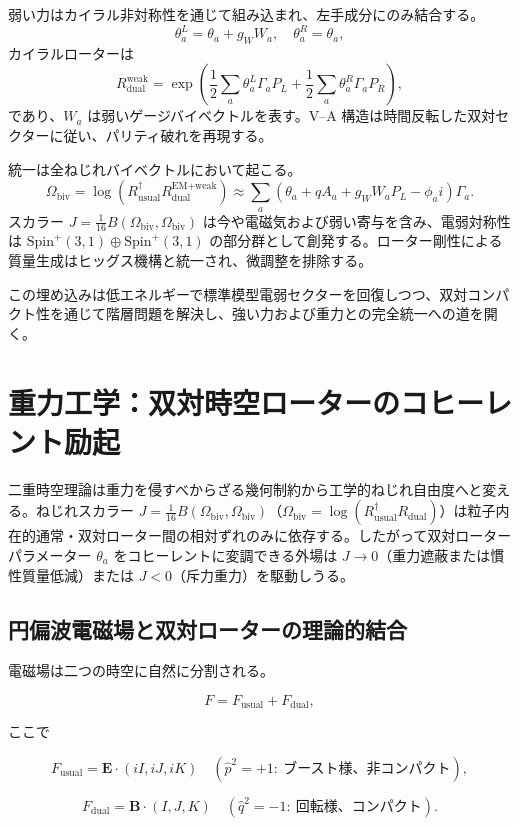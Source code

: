 \documentclass[a4paper]{article}
\begin{document}
弱い力はカイラル非対称性を通じて組み込まれ、左手成分にのみ結合する。
\[
\theta_a^L = \theta_a + g_W W_a, \quad \theta_a^R = \theta_a,
\]
カイラルローターは
\[
R_{\text{dual}}^{\text{weak}} = \exp\left( \frac{1}{2} \sum_a \theta_a^L \Gamma_a P_L + \frac{1}{2} \sum_a \theta_a^R \Gamma_a P_R \right),
\]
であり、$W_a$ は弱いゲージバイベクトルを表す。V--A 構造は時間反転した双対セクターに従い、パリティ破れを再現する。

統一は全ねじれバイベクトルにおいて起こる。
\[
\Omega_{\text{biv}} = \log\left( R_{\text{usual}}^\dagger R_{\text{dual}}^{\text{EM+weak}} \right) \approx \sum_a (\theta_a + q A_a + g_W W_a P_L - \phi_a i) \Gamma_a.
\]
スカラー $J = \frac{1}{16} B(\Omega_{\text{biv}}, \Omega_{\text{biv}})$ は今や電磁気および弱い寄与を含み、電弱対称性は $\mathrm{Spin}^+(3,1) \oplus \mathrm{Spin}^+(3,1)$ の部分群として創発する。ローター剛性による質量生成はヒッグス機構と統一され、微調整を排除する。

この埋め込みは低エネルギーで標準模型電弱セクターを回復しつつ、双対コンパクト性を通じて階層問題を解決し、強い力および重力との完全統一への道を開く。

\section{重力工学：双対時空ローターのコヒーレント励起}
\label{sec:gravitycontrol}

二重時空理論は重力を侵すべからざる幾何制約から工学的ねじれ自由度へと変える。ねじれスカラー $J = \frac{1}{16} B(\Omega_{\text{biv}}, \Omega_{\text{biv}})$（$\Omega_{\text{biv}} = \log(R_{\text{usual}}^\dagger R_{\text{dual}})$）は粒子内在的通常・双対ローター間の相対ずれのみに依存する。したがって双対ローターパラメーター $\theta_a$ をコヒーレントに変調できる外場は $J \to 0$（重力遮蔽または慣性質量低減）または $J < 0$（斥力重力）を駆動しうる。

\subsection{円偏波電磁場と双対ローターの理論的結合}

電磁場は二つの時空に自然に分割される。

\[
F = F_{\text{usual}} + F_{\text{dual}},
\]

ここで

\[
F_{\text{usual}} = \mathbf{E} \cdot (iI, iJ, iK) \quad (\hat{p}^2 = +1:\ \text{ブースト様、非コンパクト}),
\]

\[
F_{\text{dual}} = \mathbf{B} \cdot (I, J, K) \quad (\hat{q}^2 = -1:\ \text{回転様、コンパクト}).
\]
\end{document}
